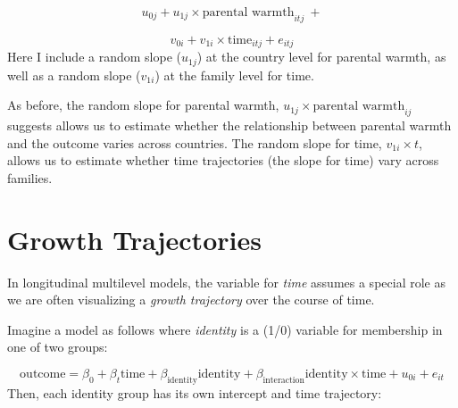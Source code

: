 \documentclass[
  letterpaper,
  DIV=11,
  numbers=noendperiod]{scrreprt}
\begin{document}
\[u_{0j} + u_{1j} \times \text{parental warmth}_{itj} \ + \]

\[v_{0i} + v_{1i} \times \text{time}_{itj} + e_{itj}\] Here I include a
random slope (\(u_{1j}\)) at the country level for parental warmth, as
well as a random slope (\(v_{1i}\)) at the family level for time.

As before, the random slope for parental warmth,
\(u_{1j} \times \text{parental warmth}_{ij}\) suggests allows us to
estimate whether the relationship between parental warmth and the
outcome varies across countries. The random slope for time,
\(v_{1i} \times t\), allows us to estimate whether time trajectories
(the slope for time) vary across families.

\section{Growth Trajectories}\label{sec-growthtrajectories}

In longitudinal multilevel models, the variable for \emph{time} assumes
a special role as we are often visualizing a \emph{growth trajectory}
over the course of time. 

Imagine a model as follows where \emph{identity} is a (1/0) variable for
membership in one of two groups:

\[\text{outcome} = \beta_0 + \beta_t \text{time} + \beta_\text{identity} \text{identity} + \beta_\text{interaction} \text{identity} \times \text{time} + u_{0i} + e_{it}\]
Then, each identity group has its own intercept and time trajectory:
\end{document}
